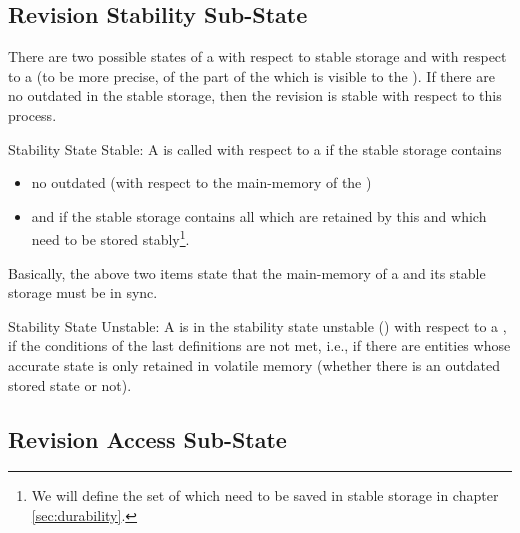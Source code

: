 \documentclass[a4paper, 12pt]{book}
\begin{document}
\subsection{Revision Stability Sub-State}

There are two possible states of a  with respect to stable
storage and with respect to a  (to be more precise, of the part
of the  which is visible to the ). If there are no
outdated  in the  stable storage, then the revision
is stable with respect to this process. 

\begin{definition*}{Stability State Stable: \revstablestorageSTABLE}
  A  is called  with respect to a 
  if the stable storage contains
  \begin{itemize}
  \item no outdated  (with respect to the main-memory of the
    )
  \item and if the stable storage contains all  which are
    retained by this  and which need to be stored
    stably\footnote{We will define the set of  which need to be
      saved in stable storage in chapter \vref{sec:durability}.}.
  \end{itemize}
  Basically, the above two items state that the main-memory of a 
  and its stable storage must be in sync.\\
\end{definition*}

\begin{definition*}{Stability State Unstable: \revstablestorageUNSTABLE}
  A  is in the stability state unstable
  (\revstablestorageUNSTABLE) with respect to a , if the conditions of the last
  definitions are not met, i.e., if there are entities whose accurate
  state is only retained in volatile memory (whether there is an
  outdated stored state or not).
\end{definition*}


\subsection{Revision Access Sub-State}
\end{document}
